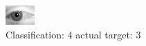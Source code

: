 \begin{figure}[h!]
\begin{center}
\includegraphics[width=0.60\columnwidth]{figures/ID2794_class_4_target_3.png}
\end{center}
\caption{ Classification: 4 actual target: 3}
\label{fig:ID2794_class_4_target_3}
\end{figure}
